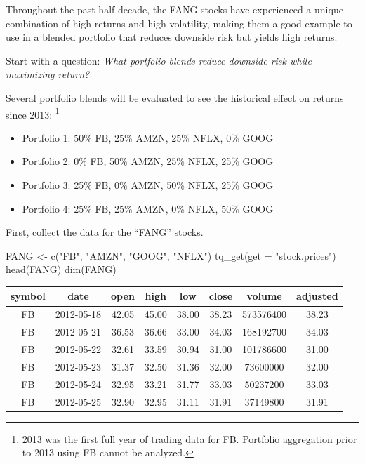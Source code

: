 Throughout the past half decade, the FANG stocks have experienced a
unique combination of high returns and high volatility, making them a
good example to use in a blended portfolio that reduces downside risk
but yields high returns.

\pagebreak

Start with a question: \emph{What portfolio blends reduce downside risk
while maximizing return?}

Several portfolio blends will be evaluated to see the historical effect
on returns since 2013:
\footnote{2013 was the first full year of trading data for FB. Portfolio aggregation prior to 2013 using FB cannot be analyzed.}

\begin{itemize}
\tightlist
\item
  Portfolio 1: 50\% FB, 25\% AMZN, 25\% NFLX, 0\% GOOG
\item
  Portfolio 2: 0\% FB, 50\% AMZN, 25\% NFLX, 25\% GOOG
\item
  Portfolio 3: 25\% FB, 0\% AMZN, 50\% NFLX, 25\% GOOG
\item
  Portfolio 4: 25\% FB, 25\% AMZN, 0\% NFLX, 50\% GOOG
\end{itemize}

First, collect the data for the ``FANG'' stocks.

\begin{Schunk}
\begin{Sinput}
FANG <- c("FB", "AMZN", "GOOG", "NFLX") %
    tq_get(get = "stock.prices")
head(FANG)
dim(FANG)
\end{Sinput}
\end{Schunk}

\begin{tabular}{cccccccc}
\toprule
symbol & date & open & high & low & close & volume & adjusted\\
\midrule
FB & 2012-05-18 & 42.05 & 45.00 & 38.00 & 38.23 & 573576400 & 38.23\\
FB & 2012-05-21 & 36.53 & 36.66 & 33.00 & 34.03 & 168192700 & 34.03\\
FB & 2012-05-22 & 32.61 & 33.59 & 30.94 & 31.00 & 101786600 & 31.00\\
FB & 2012-05-23 & 31.37 & 32.50 & 31.36 & 32.00 & 73600000 & 32.00\\
FB & 2012-05-24 & 32.95 & 33.21 & 31.77 & 33.03 & 50237200 & 33.03\\
FB & 2012-05-25 & 32.90 & 32.95 & 31.11 & 31.91 & 37149800 & 31.91\\
\bottomrule
\end{tabular}

